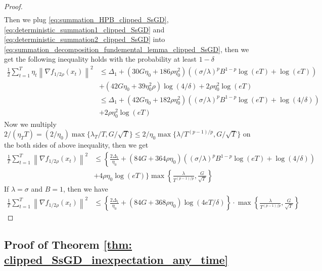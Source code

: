 \documentclass{article}
\def \sumT {\sum_{t=1}^T}
\def \nab {\nabla}
\newcommand{\norm}[2][]{\left\|#2\right\|^{#1}}
\begin{document}
\begin{proof}
\begin{align}
    \end{align}
    Then we plug \eqref{eq:summation_HPB_clipped_SsGD}, \eqref{eq:deterministic_summation1_clipped_SsGD} and \eqref{eq:deterministic_summation2_clipped_SsGD} into \eqref{eq:summation_decomposition_fundemental_lemma_clipped_SsGD}, then we get the following inequality holds with the probability at least $1-\delta$
    \begin{align}
        \frac{1}{2}\sumT\eta_t\norm[2]{\nab f_{1/2\rho}(x_t)} &\leq \Delta_1 + \left(30G\eta_0+186\rho\eta_0^2\right)\left((\sigma/\lambda)^pB^{1-p}\log(eT)+\log(eT)\right)\nonumber\\
        &+\left(42G\eta_0+39\eta_0^2\rho\right)\log(4/\delta)+2\rho\eta_0^2\log(eT)\nonumber\\
        &\leq \Delta_1 +\left (42G\eta_0+182\rho\eta_0^2\right)\left((\sigma/\lambda)^pB^{1-p}\log(eT)+\log(4/\delta)\right) \nonumber\\
        &+ 2\rho\eta_0^2\log(eT)
    \end{align}
    Now we multiply $2/(\eta_TT) = (2/\eta_0)\max\{\lambda_T/T,G/\sqrt{T}\}\leq 2/\eta_0\max\{\lambda/T^{(p-1)/p},G/\sqrt{T}\}$ on the both sides of above inequality, then we get
    \begin{align}
        \frac{1}{T}\sumT \norm[2]{\nab f_{1/2\rho}(x_t)} &\leq \left\{\frac{2\Delta_1}{\eta_0}+\left (84G+364\rho\eta_0\right)\left((\sigma/\lambda)^pB^{1-p}\log(eT)+\log(4/\delta)\right)\right.\nonumber\\
        &+ 4\rho\eta_0\log(eT)\Big\}\max\left\{\frac{\lambda}{T^{(p-1)/p}},\frac{G}{\sqrt{T}}\right\}
    \end{align}
    If $\lambda=\sigma$ and $B=1$, then we have
    \begin{align}
        \frac{1}{T}\sumT \norm[2]{\nab f_{1/2\rho}(x_t)} &\leq \left\{\frac{2\Delta_1}{\eta_0}+\left (84G+368\rho\eta_0\right)\log(4eT/\delta)\right\}\cdot\max\left\{\frac{\lambda}{T^{(p-1)/p}},\frac{G}{\sqrt{T}}\right\}
    \end{align}
\end{proof}

\subsection{Proof of Theorem \ref{thm: clipped_SsGD_inexpectation_any_time}}
\end{document}
